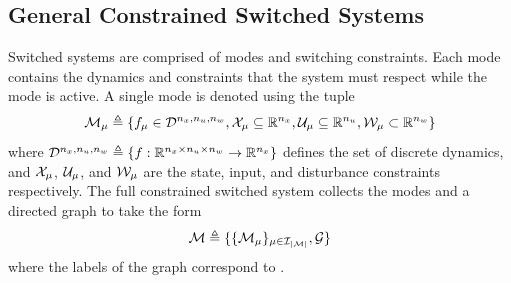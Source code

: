 \subsection{General Constrained Switched Systems}
Switched systems  are comprised of modes and switching constraints. Each mode contains the dynamics and constraints that the system must respect while the mode is active. A single mode is denoted using the tuple
\begin{equation*}
\mode{\modeidx}\triangleq\{f_\modeidx\in \mathcal{D}^{\nx,\nu,\nw}, \xcon[\modeidx]\subseteq\real^\nx, \ucon[\modeidx]\subseteq\real^\nu, \wcon[\modeidx]\subset\real^\nw\}
\end{equation*}
where $\mathcal{D}^{{n_x},{n_u},{n_w}}\triangleq\{f:\mathbb{R}^{{n_x}\times{n_u}\times{n_w}}\rightarrow\mathbb{R}^{{n_x}}\}$ defines the set of discrete dynamics,  and $\xcon[\modeidx]$, $\ucon[\modeidx]$, and  $\wcon[\modeidx]$ are the state, input, and disturbance constraints respectively. The full constrained switched system collects the modes and a directed graph to take the form
\begin{equation}\label{eq:basic_switched_sys}
\modes\triangleq\{\{\mode{\modeidx}\}_{\modeidx\in\idxset{\nummodes}}, \graph\}
\end{equation}
where the labels of the graph correspond to .


